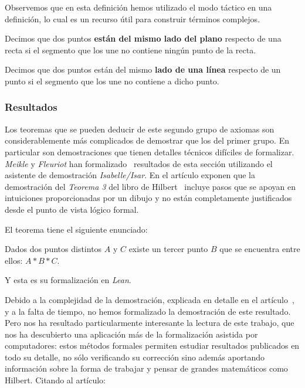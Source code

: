 Observemos que en esta definición hemos utilizado el modo táctico en una
definición, lo cual es un recurso útil para construir términos complejos.

\begin{defin*}
	Decimos que dos puntos \textbf{están del mismo lado del plano} respecto de una
	recta si el segmento que los une no contiene ningún punto de la recta.
\end{defin*}


\begin{defin*}
	Decimos que dos puntos están del mismo \textbf{lado de una línea} respecto de
	un punto si el segmento que los une no contiene a dicho punto.
\end{defin*}


\subsubsection{Resultados}%

Los teoremas que se pueden deducir de este segundo grupo de axiomas son
considerablemente más complicados de demostrar que los del primer grupo. En
particular son demostraciones que tienen detalles técnicos difíciles de
formalizar. \textit{Meikle} y \textit{Fleuriot} han
formalizado~\cite{meikleFormalizingHilbertGrundlagen2003} resultados de esta
sección utilizando el asistente de demostración \textit{Isabelle/Isar}. En el
artículo exponen que la demostración del \textit{Teorema 3} del libro de
Hilbert~\cite{hilbertFoundationsGeometry} incluye pasos que se apoyan en
intuiciones proporcionadas por un dibujo y no están completamente justificados
desde el punto de vista lógico formal.

El teorema tiene el siguiente enunciado:

\setcounter{tma}{2}
\begin{tma}
	Dados dos puntos distintos $A$ y $C$ existe un tercer punto $B$ que se
	encuentra entre ellos: $A * B * C$.
\end{tma}

Y esta es su formalización en \textit{Lean}.


Debido a la complejidad de la demostración, explicada en detalle en el
artículo~\cite{meikleFormalizingHilbertGrundlagen2003}, y a la falta de tiempo,
no hemos formalizado la demostración de este resultado. Pero nos ha resultado
particularmente interesante la lectura de este trabajo, que nos ha descubierto
una aplicación más de la formalización asistida por computadores: estos métodos
formales permiten estudiar resultados publicados en todo su detalle,
no sólo verificando su corrección sino además aportando información sobre la
forma de trabajar y pensar de grandes matemáticos como Hilbert. Citando al
artículo:

